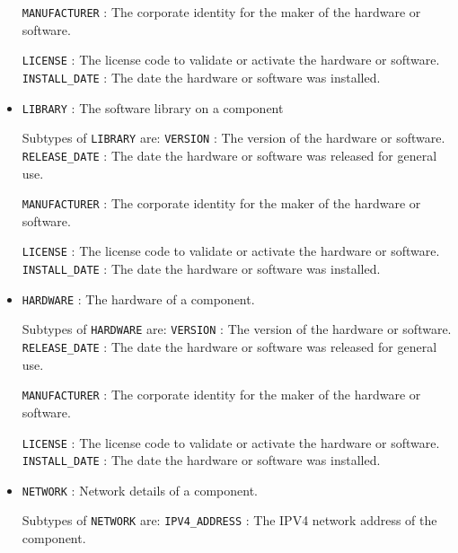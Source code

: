 \begin{itemize}
\newline\tab \texttt{MANUFACTURER} : The corporate identity for the maker of the hardware or software.
 
\newline\tab \texttt{LICENSE} : The license code to validate or activate the hardware or software. 
\newline\tab \texttt{INSTALL_DATE} : The date the hardware or software was installed. 
\item \texttt{LIBRARY} : The software library on a component 

Subtypes of \texttt{LIBRARY} are: 
\newline\tab \texttt{VERSION} : The version of the hardware or software. 
\newline\tab \texttt{RELEASE_DATE} : The date the hardware or software was released for general use.
 
\newline\tab \texttt{MANUFACTURER} : The corporate identity for the maker of the hardware or software.
 
\newline\tab \texttt{LICENSE} : The license code to validate or activate the hardware or software. 
\newline\tab \texttt{INSTALL_DATE} : The date the hardware or software was installed. 
\item \texttt{HARDWARE} : The hardware of a component.
 

Subtypes of \texttt{HARDWARE} are: 
\newline\tab \texttt{VERSION} : The version of the hardware or software. 
\newline\tab \texttt{RELEASE_DATE} : The date the hardware or software was released for general use.
 
\newline\tab \texttt{MANUFACTURER} : The corporate identity for the maker of the hardware or software.
 
\newline\tab \texttt{LICENSE} : The license code to validate or activate the hardware or software. 
\newline\tab \texttt{INSTALL_DATE} : The date the hardware or software was installed. 
\item \texttt{NETWORK} : Network details of a component. 

Subtypes of \texttt{NETWORK} are: 
\newline\tab \texttt{IPV4_ADDRESS} : The IPV4 network address of the component.
 

\end{itemize}
